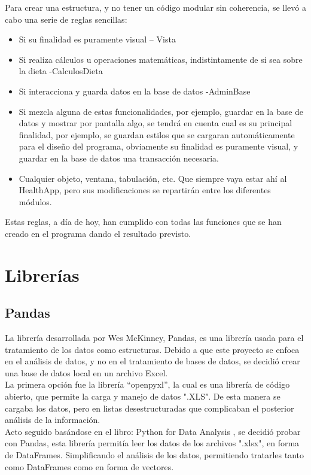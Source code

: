 Para crear una estructura, y no tener un código modular sin coherencia, se llevó a cabo una serie de reglas sencillas:
\begin{itemize}
\item	Si su finalidad es puramente visual – Vista
\item	Si realiza cálculos u operaciones matemáticas, indistintamente de si sea sobre la dieta -CalculosDieta
\item	Si interacciona y guarda datos en la base de datos -AdminBase
\item	Si mezcla alguna de estas funcionalidades, por ejemplo, guardar en la base de datos y mostrar por pantalla algo, se tendrá en cuenta cual es su principal finalidad, por ejemplo, se guardan estilos que se cargaran automáticamente para el diseño del programa, obviamente su finalidad es puramente visual, y guardar en la base de datos una transacción necesaria.
\item	Cualquier objeto, ventana, tabulación, etc. Que siempre vaya estar ahí al HealthApp, pero sus modificaciones se repartirán entre los diferentes módulos.

\end{itemize}
Estas reglas, a día de hoy, han cumplido con todas las funciones que se han creado en el programa dando el resultado previsto.
\section{Librerías}
\subsection{Pandas}
La librería desarrollada por Wes McKinney, Pandas, es una librería usada para el tratamiento de los datos como estructuras. Debido a que este proyecto se enfoca en el análisis de datos, y no en el tratamiento de bases de datos, se decidió crear una base de datos local en un archivo Excel.\\
La primera opción fue la librería “openpyxl”, la cual es una librería de código abierto, que permite la carga y manejo de datos ".XLS". De esta manera se  cargaba los datos, pero en listas desestructuradas que complicaban el posterior análisis de la información.\\
Acto seguido basándose en el libro: Python for Data Analysis \cite{analisis}, se decidió probar con Pandas, esta librería permitía leer los datos de los archivos ".xlsx", en forma de DataFrames. Simplificando el análisis de los datos, permitiendo tratarles tanto como DataFrames como en forma de vectores.
